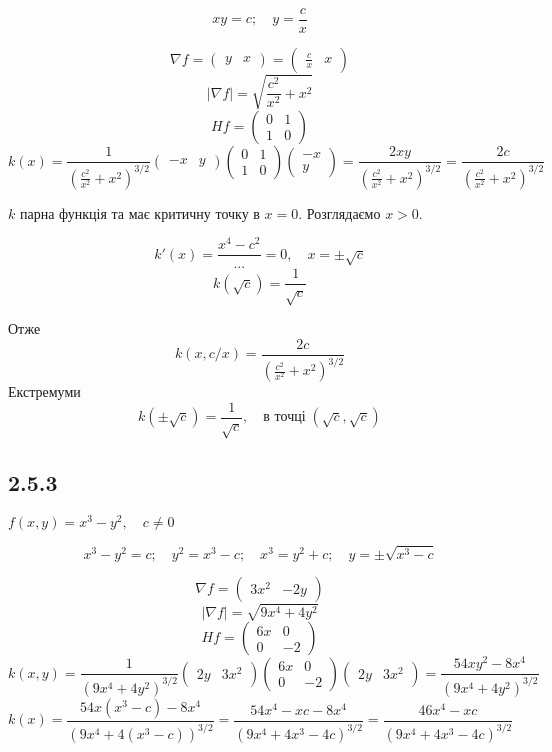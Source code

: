 \documentclass[10pt, a4paper]{article} %
\begin{document}
\[xy=c; \quad y=\frac{c}{x}\]

\[\nabla f = \begin{pmatrix} y & x\end{pmatrix} = \begin{pmatrix} \frac{c}{x} & x\end{pmatrix}\]
\[|\nabla f| = \sqrt{\frac{c^2}{x^2} + x^2}\]
\[Hf = \begin{pmatrix}
    0 & 1 \\ 1 & 0
\end{pmatrix}\]
\[k(x) = \frac{1}{\left(\frac{c^2}{x^2} + x^2\right)^{3/2}} \begin{pmatrix} -x & y\end{pmatrix} \begin{pmatrix}
    0 & 1 \\ 1 & 0
\end{pmatrix} \begin{pmatrix} -x \\ y\end{pmatrix} = \frac{2xy}{\left(\frac{c^2}{x^2} + x^2\right)^{3/2}} = \frac{2c}{\left(\frac{c^2}{x^2} + x^2\right)^{3/2}}\]

$k$ парна функція та має критичну точку в $x=0$. Розглядаємо $x>0$. 

\[k'(x) = \frac{x^4-c^2}{...} = 0, \quad x=\pm \sqrt{c}\]
\[k(\sqrt{c}) = \frac{1}{\sqrt{c}}\]

Отже
\[k(x, c/x) = \frac{2c}{\left(\frac{c^2}{x^2} + x^2\right)^{3/2}}\]
Екстремуми
\[k(\pm\sqrt{c}) = \frac{1}{\sqrt{c}}, \quad \text{в точці} \; (\sqrt{c}, \sqrt{c})\] 


\subsection*{2.5.3}
\begin{mdframed}
    $f(x,y) = x^3 - y^2, \quad c \ne 0$
\end{mdframed}

\[ x^3 - y^2=c; \quad y^2 = x^3-c; \quad x^3 = y^2+c; \quad y=\pm\sqrt{x^3-c}\]

\[\nabla f = \begin{pmatrix} 3x^2 & -2y\end{pmatrix}\]
\[|\nabla f| = \sqrt{9x^4+4y^2}\]
\[Hf = \begin{pmatrix}
    6x & 0 \\ 0 & -2
\end{pmatrix}\]
\[k(x,y) = \frac{1}{(9x^4+4y^2)^{3/2}} \begin{pmatrix} 2y & 3x^2\end{pmatrix} \begin{pmatrix}
    6x & 0 \\ 0 & -2
\end{pmatrix} \begin{pmatrix} 2y & 3x^2\end{pmatrix} = \frac{54xy^2 - 8x^4}{(9x^4+4y^2)^{3/2}}\]
\[k(x) = \frac{54x(x^3-c) - 8x^4}{(9x^4+4(x^3-c))^{3/2}} 
= \frac{54x^4-xc - 8x^4}{(9x^4+4x^3-4c)^{3/2}} = \frac{46x^4-xc}{(9x^4+4x^3-4c)^{3/2}}\]
\end{document}
